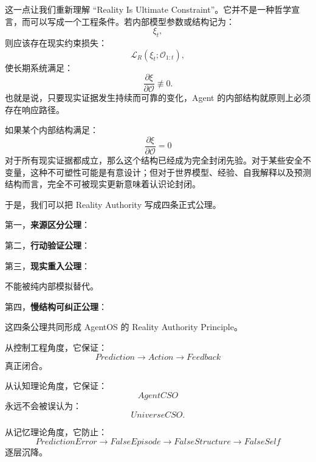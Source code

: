 这一点让我们重新理解 ``Reality Is Ultimate Constraint''。它并不是一种哲学宣言，而可以写成一个工程条件。若内部模型参数或结构记为：
\[
\xi_t,
\]
则应该存在现实约束损失：
\[
\mathcal L_R(\xi_t;\mathcal O_{1:t}),
\]
使长期系统满足：
\[
\boxed{
\frac{\partial \xi}{\partial \mathcal O}
\not\equiv0.
}
\]
也就是说，只要现实证据发生持续而可靠的变化，Agent 的内部结构就原则上必须存在响应路径。

如果某个内部结构满足：
\[
\frac{\partial \xi}{\partial \mathcal O}
=0
\]
对于所有现实证据都成立，那么这个结构已经成为完全封闭先验。对于某些安全不变量，这种不可塑性可能是有意设计；但对于世界模型、经验、自我解释以及预测结构而言，完全不可被现实更新意味着认识论封闭。

于是，我们可以把 Reality Authority 写成四条正式公理。

第一，\textbf{来源区分公理}：
\begin{statementbox}
\centering
{}
\end{statementbox}

第二，\textbf{行动验证公理}：
\begin{statementbox}
\centering
{}
\end{statementbox}

第三，\textbf{现实重入公理}：
\begin{statementbox}
\centering
{}
\end{statementbox}
不能被纯内部模拟替代。

第四，\textbf{慢结构可纠正公理}：
\begin{statementbox}
\centering
{}
\end{statementbox}

这四条公理共同形成 AgentOS 的 Reality Authority Principle。

从控制工程角度，它保证：
\[
Prediction
\rightarrow
Action
\rightarrow
Feedback
\]
真正闭合。

从认知理论角度，它保证：
\[
AgentCSO
\]
永远不会被误认为：
\[
UniverseCSO.
\]

从记忆理论角度，它防止：
\[
PredictionError
\rightarrow
FalseEpisode
\rightarrow
FalseStructure
\rightarrow
FalseSelf
\]
逐层沉降。

